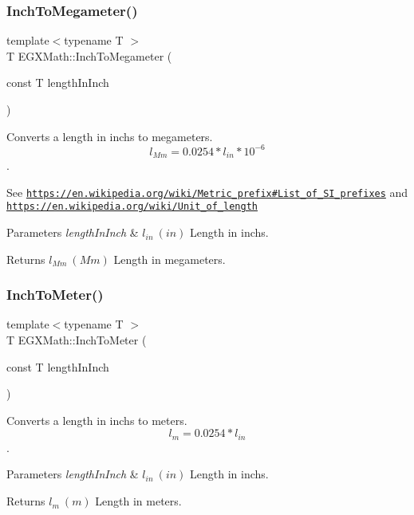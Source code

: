 \subsubsection{\texorpdfstring{Inch\+To\+Megameter()}{InchToMegameter()}}
{\footnotesize\ttfamily template$<$typename T $>$ \\
T E\+G\+X\+Math\+::\+Inch\+To\+Megameter (\begin{DoxyParamCaption}\item[{const T}]{length\+In\+Inch }\end{DoxyParamCaption})}



Converts a length in inchs to megameters. \[ l_{Mm}=0.0254 * l_{in} * 10^{-6} \]. 

See \href{https://en.wikipedia.org/wiki/Metric_prefix#List_of_SI_prefixes}{\tt https\+://en.\+wikipedia.\+org/wiki/\+Metric\+\_\+prefix\#\+List\+\_\+of\+\_\+\+S\+I\+\_\+prefixes} and \href{https://en.wikipedia.org/wiki/Unit_of_length}{\tt https\+://en.\+wikipedia.\+org/wiki/\+Unit\+\_\+of\+\_\+length} 
\begin{DoxyParams}{Parameters}
{\em length\+In\+Inch} & $ l_{in}\ (in)$ Length in inchs. \\
\hline
\end{DoxyParams}
\begin{DoxyReturn}{Returns}
$ l_{Mm}\ (Mm)$ Length in megameters. 
\end{DoxyReturn}
\mbox{\label{group___e_g_x_math-_conversions-_length_conversions-_imperial-_inch-_s_i_ga945abc9740e48bb25302203731967474}} 
\subsubsection{\texorpdfstring{Inch\+To\+Meter()}{InchToMeter()}}
{\footnotesize\ttfamily template$<$typename T $>$ \\
T E\+G\+X\+Math\+::\+Inch\+To\+Meter (\begin{DoxyParamCaption}\item[{const T}]{length\+In\+Inch }\end{DoxyParamCaption})}



Converts a length in inchs to meters. \[ l_{m}=0.0254 * l_{in} \]. 


\begin{DoxyParams}{Parameters}
{\em length\+In\+Inch} & $ l_{in}\ (in)$ Length in inchs. \\
\hline
\end{DoxyParams}
\begin{DoxyReturn}{Returns}
$ l_{m}\ (m)$ Length in meters. 
\end{DoxyReturn}
\mbox{\label{group___e_g_x_math-_conversions-_length_conversions-_imperial-_inch-_s_i_ga664100ea5f92f4e92686e217e996b475}} 
